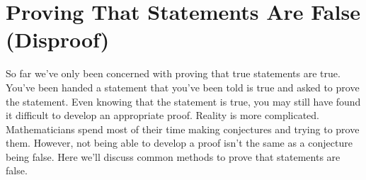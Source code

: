 
\chapter{Proving That Statements Are False (Disproof)}


So far we've only been concerned with proving that true statements are true.  You've been handed a statement that you've been told is true and asked to prove the statement.  Even knowing that the statement is true, you may still have found it difficult to develop an appropriate proof.  Reality is more complicated.  Mathematicians spend most of their time making conjectures and trying to prove them.  However, not being able to develop a proof isn't the same as a conjecture being false.  Here we'll discuss common methods to prove that statements are false.

% 	

\begin{center}
\end{center}
